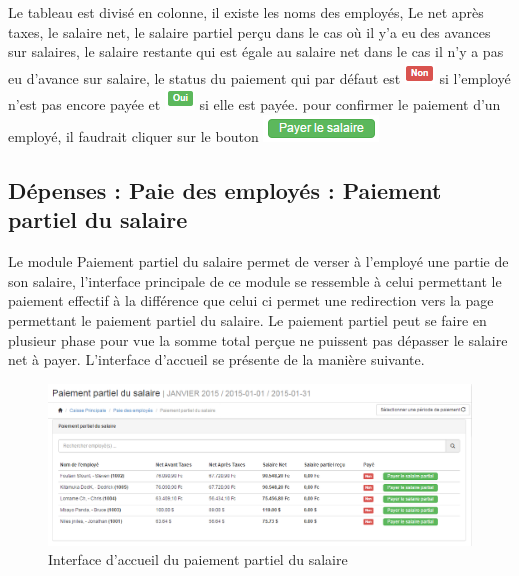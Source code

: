 \documentclass[12pt,a4paper]{report}
\begin{document}
Le tableau est divisé en colonne, il existe les noms des employés, Le net après taxes, le salaire net, le salaire partiel perçu dans le cas où il y'a eu des avances sur salaires, le salaire restante qui est égale au salaire net dans le cas il n'y a pas eu d'avance sur salaire, le status du paiement qui par défaut est \includegraphics[scale=0.7]{pic/NonTaxes.png} si l'employé n'est pas encore payée et \includegraphics[scale=0.7]{pic/OuiTaxes.png} si elle est payée. pour confirmer le paiement d'un employé, il faudrait cliquer sur le bouton \includegraphics[scale=0.7]{pic/PayeSalary.png}

\subsection{Dépenses : Paie des employés : Paiement partiel du salaire}
Le module Paiement partiel du salaire permet de verser à l'employé une partie de son salaire, l'interface principale de ce module se ressemble à celui permettant le paiement effectif à la différence que celui ci permet une redirection vers la page permettant le paiement partiel du salaire.
Le paiement partiel peut se faire en plusieur phase pour vue la somme total perçue ne puissent pas dépasser le salaire net à payer. L'interface d'accueil se présente de la manière suivante.

\begin{figure}[h]
\begin{center}
\includegraphics[width=14cm]{pic/PaiePartSalaire.png}
\end{center}
\caption{Interface d'accueil du paiement partiel du salaire}
\label{Interface d'accueil du paiement partiel du salaire}
\end{figure}
\end{document}
